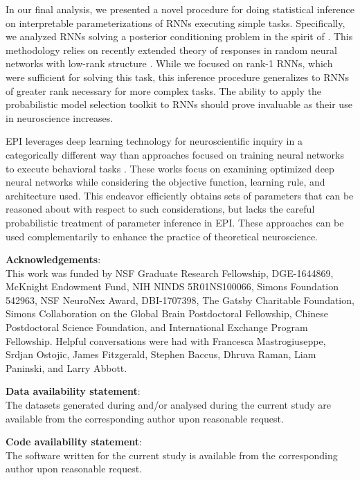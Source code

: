 \documentclass[11pt]{article}
\begin{document}
In our final analysis, we presented a novel procedure for doing statistical inference on interpretable parameterizations of RNNs executing simple tasks. 
Specifically, we analyzed RNNs solving a posterior conditioning problem in the spirit of \cite{pitkow2017inference, echeveste2019cortical}. 
This methodology relies on recently extended theory of responses in random neural networks with low-rank structure \cite{mastrogiuseppe2018linking}. 
While we focused on rank-1 RNNs, which were sufficient for solving this task, this inference procedure generalizes to RNNs of greater rank necessary for more complex tasks.
The ability to apply the probabilistic model selection toolkit to RNNs should prove invaluable as their use in neuroscience increases.

EPI leverages deep learning technology for neuroscientific inquiry in a categorically different way than approaches focused on training neural networks to execute behavioral tasks \cite{richards2019deep}. 
These works focus on examining optimized deep neural networks while considering the objective function, learning rule, and architecture used.
This endeavor efficiently obtains sets of parameters that can be reasoned about with respect to such considerations, but lacks the careful probabilistic treatment of parameter inference in EPI.
These approaches can be used complementarily to enhance the practice of theoretical neuroscience.

\textbf{Acknowledgements}: \\
This work was funded by NSF Graduate Research Fellowship,  DGE-1644869, McKnight Endowment Fund, NIH NINDS 5R01NS100066, Simons Foundation 542963, NSF NeuroNex Award, DBI-1707398, The Gatsby Charitable Foundation, Simons Collaboration on the Global Brain Postdoctoral Fellowship, Chinese Postdoctoral Science Foundation, and International Exchange Program Fellowship. 
Helpful conversations were had with Francesca Mastrogiuseppe, Srdjan Ostojic, James Fitzgerald, Stephen Baccus, Dhruva Raman, Liam Paninski, and Larry Abbott.

\textbf{Data availability statement}: \\
The datasets generated during and/or analysed during the current study are available from the corresponding author upon reasonable request.

\textbf{Code availability statement}: \\
The software written for the current study is available from the corresponding author upon reasonable request.
\end{document}

